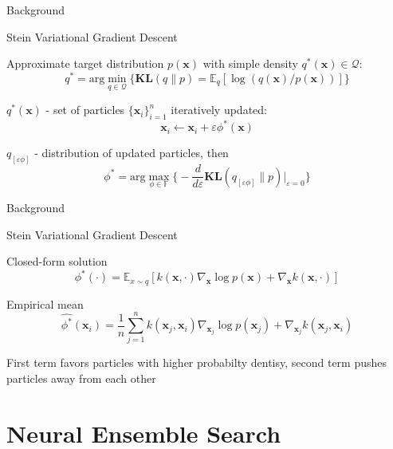 \documentclass{beamer}
\def\*#1{\mathbf{#1}}
\begin{document}
\begin{frame}{Background}

\begin{block}{Stein Variational Gradient Descent}

Approximate target distribution $p(\*x)$ with simple density $q^*(\*x) \in \mathcal{Q}$:
\[q^* = \text{arg}\min\limits_{q \in \mathcal{Q} } \{\*{KL}(q\| p) = \mathbb{E}_q [\log (q(\*x ) / p(\*x))]\}\]

$q^*(\*x)$ - set of particles $\{\*x_i\}_{i=1}^n$ iteratively updated:
\[\*x_i \leftarrow \*x_i + \varepsilon \phi^*(\*x)\]

$q_{[\varepsilon \phi]}$ - distribution of updated particles, then
\[\phi^* = \text{arg} \max_{\phi \in \mathbb{F}} \Big\{-\dfrac{d}{d\varepsilon} \*{KL} (q_{[\varepsilon \phi]} \| p) \Big|_{\varepsilon = 0} \Big\}\]
    
\end{block} 

\end{frame}

\begin{frame}{Background}
\begin{block}{Stein Variational Gradient Descent}

Closed-form solution
\[\phi^*(\cdot) = \mathbb{E}_{x\sim q} [k(\*x, \cdot) \nabla_{\*x} \log p(\*x) + \nabla_{\*x} k(\*x, \cdot)]\]

Empirical mean
\[\hat{\phi^*}(\*x_i) = \dfrac1n \sum\limits_{j=1}^n k(\*x_j, \*x_i) \nabla_{\*x_j} \log p(\*x_j) + \nabla_{\*x_j} k(\*x_j, \*x_i)\]

First term favors particles with higher probabilty dentisy, second term pushes particles away from each other
\end{block}
\end{frame}

\section{Neural Ensemble Search}
\end{document}
